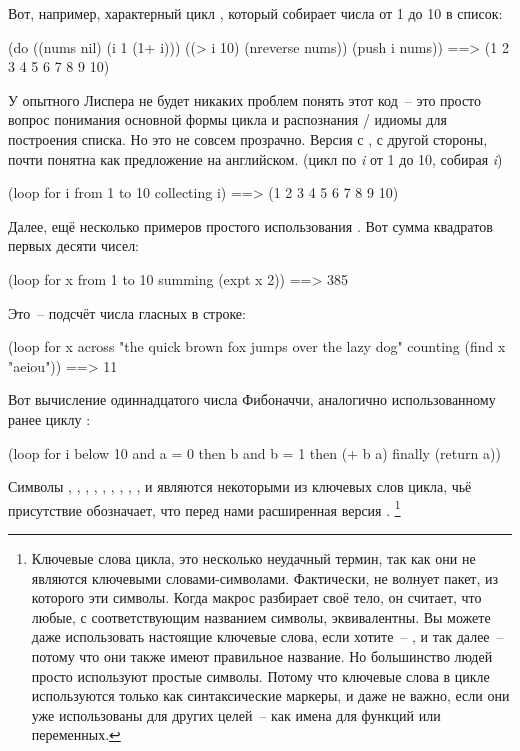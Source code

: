 Вот, например, характерный цикл , который собирает числа от 1 до 10 в список:

\begin{myverb}
(do ((nums nil) (i 1 (1+ i)))
    ((> i 10) (nreverse nums))
  (push i nums)) ==> (1 2 3 4 5 6 7 8 9 10)
\end{myverb}

У опытного Лиспера не будет никаких проблем понять этот код~-- это просто вопрос
понимания основной формы  цикла и распознания / идиомы
для построения списка. Но это не совсем прозрачно. Версия с , с другой стороны,
почти понятна как предложение на английском. (цикл по \textit{i} от 1 до 10, собирая
\textit{i})

\begin{myverb}
(loop for i from 1 to 10 collecting i) ==> (1 2 3 4 5 6 7 8 9 10)
\end{myverb}

Далее, ещё несколько примеров простого использования . Вот сумма квадратов
первых десяти чисел:

\begin{myverb}
(loop for x from 1 to 10 summing (expt x 2)) ==> 385
\end{myverb}

Это~-- подсчёт числа гласных в строке:

\begin{myverb}
(loop for x across "the quick brown fox jumps over the lazy dog"
      counting (find x "aeiou")) ==> 11
\end{myverb}

Вот вычисление одиннадцатого числа Фибоначчи, аналогично использованному ранее циклу :

\begin{myverb}
(loop for i below 10
      and a = 0 then b
      and b = 1 then (+ b a)
      finally (return  a))
\end{myverb}

Символы , , , , ,
, , , ,  и  являются
некоторыми из ключевых слов цикла, чьё присутствие обозначает, что перед нами расширенная
версия . \footnote{Ключевые слова цикла, это несколько неудачный термин, так
  как они не являются ключевыми словами-символами. Фактически,  не волнует
  пакет, из которого эти символы. Когда макрос  разбирает своё тело, он
  считает, что любые, с соответствующим названием символы, эквивалентны. Вы можете даже
  использовать настоящие ключевые слова, если хотите~-- ,  и так
  далее~-- потому что они также имеют правильное название. Но большинство людей просто
  используют простые символы. Потому что ключевые слова в цикле используются только как
  синтаксические маркеры, и даже не важно, если они уже использованы для других целей~--
  как имена для функций или переменных.}

